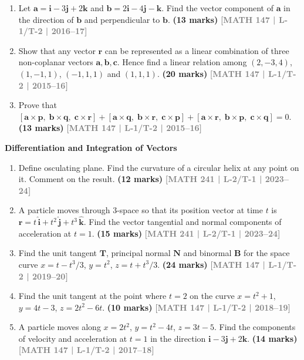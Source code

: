 \documentclass[12pt,a3paper]{article}
\newcommand{\yr}[1]{\hfill\textcolor{gray}{\small\textbf{[#1]}}}
\newcommand{\mk}[1]{\textcolor{orange!70!black}{\small\textbf{(#1 marks)}}}
\newcommand{\subtopic}[2]{%
  \vspace{10pt}
  \noindent\begin{tcolorbox}[colback=#1!8,colframe=#1,boxrule=0.6pt,arc=4pt,
    left=6pt,right=6pt,top=4pt,bottom=4pt]
    \small\bfseries\textcolor{#1}{#2}
  \end{tcolorbox}
  \vspace{2pt}
}
\begin{document}
\begin{enumerate}
\item Let $\mathbf{a}=\mathbf{i}-3\mathbf{j}+2\mathbf{k}$ and $\mathbf{b}=2\mathbf{i}-4\mathbf{j}-\mathbf{k}$. Find the vector component of $\mathbf{a}$ in the direction of $\mathbf{b}$ and perpendicular to $\mathbf{b}$.
\mk{13} \yr{MATH 147 | L-1/T-2 | 2016--17}


\item Show that any vector $\mathbf{r}$ can be represented as a linear combination of three non-coplanar vectors $\mathbf{a},\mathbf{b},\mathbf{c}$. Hence find a linear relation among $(2,-3,4)$, $(1,-1,1)$, $(-1,1,1)$ and $(1,1,1)$.
\mk{20} \yr{MATH 147 | L-1/T-2 | 2015--16}


\item Prove that $[\mathbf{a}\times\mathbf{p},\;\mathbf{b}\times\mathbf{q},\;\mathbf{c}\times\mathbf{r}]+[\mathbf{a}\times\mathbf{q},\;\mathbf{b}\times\mathbf{r},\;\mathbf{c}\times\mathbf{p}]+[\mathbf{a}\times\mathbf{r},\;\mathbf{b}\times\mathbf{p},\;\mathbf{c}\times\mathbf{q}]=0$.
\mk{13} \yr{MATH 147 | L-1/T-2 | 2015--16}


\end{enumerate}
\subtopic{cD}{Differentiation and Integration of Vectors}
\label{sub:s4-diffint}
\begin{enumerate}


\item Define osculating plane. Find the curvature of a circular helix at any point on it. Comment on the result.
\mk{12} \yr{MATH 241 | L-2/T-1 | 2023--24}


\item A particle moves through 3-space so that its position vector at time $t$ is $\mathbf{r}=t\,\hat{\mathbf{i}}+t^{2}\,\hat{\mathbf{j}}+t^{3}\,\hat{\mathbf{k}}$. Find the vector tangential and normal components of acceleration at $t=1$.
\mk{15} \yr{MATH 241 | L-2/T-1 | 2023--24}


\item Find the unit tangent $\mathbf{T}$, principal normal $\mathbf{N}$ and binormal $\mathbf{B}$ for the space curve $x=t-t^{3}/3$, $y=t^{2}$, $z=t+t^{3}/3$.
\mk{24} \yr{MATH 147 | L-1/T-2 | 2019--20}



\item Find the unit tangent at the point where $t=2$ on the curve $x=t^{2}+1$, $y=4t-3$, $z=2t^{2}-6t$.
\mk{10} \yr{MATH 147 | L-1/T-2 | 2018--19}


\item A particle moves along $x=2t^{2}$, $y=t^{2}-4t$, $z=3t-5$. Find the components of velocity and acceleration at $t=1$ in the direction $\mathbf{i}-3\mathbf{j}+2\mathbf{k}$.
\mk{14} \yr{MATH 147 | L-1/T-2 | 2017--18}


\end{enumerate}
\end{document}
